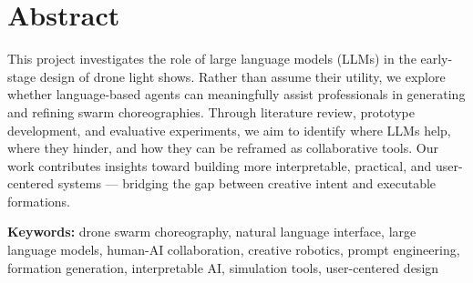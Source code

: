 \newpage
{}
\setcounter{page}{1}
\section{Abstract}
\noindent

This project investigates the role of large language models (LLMs) in the early-stage design of drone light shows. Rather than assume their utility, we explore whether language-based agents can meaningfully assist professionals in generating and refining swarm choreographies. Through literature review, prototype development, and evaluative experiments, we aim to identify where LLMs help, where they hinder, and how they can be reframed as collaborative tools. Our work contributes insights toward building more interpretable, practical, and user-centered systems — bridging the gap between creative intent and executable formations.

\vspace{1in}
\noindent \textbf{Keywords:} drone swarm choreography, natural language interface, large language models, human-AI collaboration, creative robotics, prompt engineering, formation generation, interpretable AI, simulation tools, user-centered design
